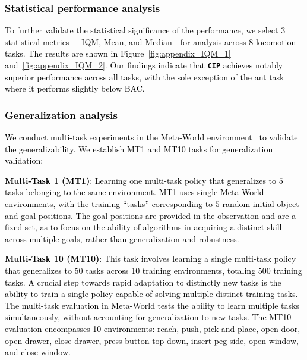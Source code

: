 \textcolor{black}{
\subsubsection{Statistical performance analysis}
\label{sec:appendix_statis}
To further validate the statistical significance of the performance, we select $3$ statistical metrics~\citep{agarwal2021deep} - IQM, Mean, and Median - for analysis across $8$ locomotion tasks. The results are shown in Figure~\ref{fig:appendix_IQM_1} and~\ref{fig:appendix_IQM_2}. Our findings indicate that \texttt{\textbf{CIP}} achieves notably superior performance across all tasks, with the sole exception of the ant task where it performs slightly below BAC.
}

\textcolor{black}{
\vspace{-5mm}
\subsubsection{Generalization analysis}
We conduct multi-task experiments in the Meta-World environment~\citep{yu2020meta} to validate the generalizability. We establish MT1 and MT10 tasks for generalization validation:
}

\textcolor{black}{
\textbf{Multi-Task 1 (MT1)}: Learning one multi-task policy that generalizes to $5$ tasks belonging to the same environment. MT1 uses single Meta-World environments, with the training “tasks” corresponding to $5$ random initial object and goal positions. The goal positions are provided in the observation and are a fixed set, as to focus on the ability of algorithms in acquiring a distinct skill across multiple goals, rather than generalization and robustness.
}

\textcolor{black}{
\textbf{Multi-Task 10 (MT10)}: This task involves learning a single multi-task policy that generalizes to 50 tasks across 10 training environments, totaling 500 training tasks. A crucial step towards rapid adaptation to distinctly new tasks is the ability to train a single policy capable of solving multiple distinct training tasks. The multi-task evaluation in Meta-World tests the ability to learn multiple tasks simultaneously, without accounting for generalization to new tasks. The MT10 evaluation encompasses 10 environments: reach, push, pick and place, open door, open drawer, close drawer, press button top-down, insert peg side, open window, and close window.
}

